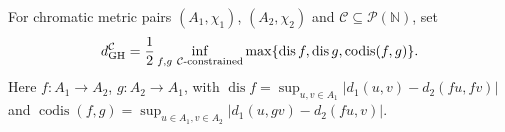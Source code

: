 
For chromatic metric pairs $(A_1,\chi_1)$, $(A_2,\chi_2)$ and $\mathcal C\subseteq\mathcal P(\mathbb N)$, set
\[
d_{\rm GH}^{\mathcal C}=\frac12\inf_{f,g\ {\mathcal C}\text{-constrained}}\max\{\operatorname{dis}f,\operatorname{dis}g,\operatorname{codis}(f,g)\}.
\]
Here $f:A_1\to A_2$, $g:A_2\to A_1$, with $\operatorname{dis}f=\sup_{u,v\in A_1}|d_1(u,v)-d_2(fu,fv)|$ and $\operatorname{codis}(f,g)=\sup_{u\in A_1,v\in A_2}|d_1(u,gv)-d_2(fu,v)|$.
